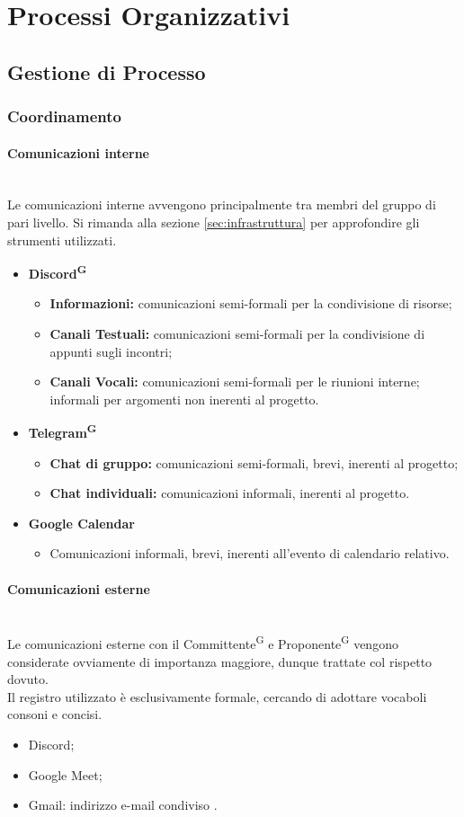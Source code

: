 \documentclass[8pt]{article}
\newcommand{\glossterm}[1]{#1\textsuperscript{G}} %
\newcommand{\subsubsubsection}[1]{\paragraph{#1}\mbox{}\\}
\begin{document}
\section{Processi Organizzativi} \label{sec:processi_organizzativi}

\subsection{Gestione di Processo}

\subsubsection{Coordinamento} \label{sec:coordinamento}

\subsubsubsection{Comunicazioni interne}
Le comunicazioni interne avvengono principalmente tra membri del gruppo di pari livello. Si rimanda alla sezione \hypersetup{hidelinks}\ref{sec:infrastruttura} per approfondire gli strumenti utilizzati.
\begin{itemize}
  \item{\textbf{\glossterm{Discord}}}
  \begin{itemize}
    \item \textbf{Informazioni:} comunicazioni semi-formali per la condivisione di risorse;
    \item \textbf{Canali Testuali:} comunicazioni semi-formali per la condivisione di appunti sugli
        incontri;
    \item \textbf{Canali Vocali:} comunicazioni semi-formali per le riunioni interne; informali per argomenti non inerenti al progetto.
  \end{itemize}
  \item{\textbf{\glossterm{Telegram}}}
  \begin{itemize}
    \item \textbf{Chat di gruppo:} comunicazioni semi-formali, brevi, inerenti al progetto;
    \item \textbf{Chat individuali:} comunicazioni informali, inerenti al progetto.
  \end{itemize}
  \item{\textbf{Google Calendar}}
  \begin{itemize}
    \item{Comunicazioni informali, brevi, inerenti all'evento di calendario relativo.}
  \end{itemize}
\end{itemize}

\subsubsubsection{Comunicazioni esterne}
Le comunicazioni esterne con il \glossterm{Committente} e \glossterm{Proponente} vengono considerate ovviamente di importanza maggiore, dunque trattate col rispetto dovuto.\\
Il registro utilizzato è esclusivamente formale, cercando di adottare vocaboli consoni e concisi.
\begin{itemize}
  \item Discord;
  \item Google Meet;
  \item Gmail: indirizzo e-mail condiviso
      \href{nan1fyteam.unipd@gmail.com}{\color{black}{nan1fyteam.unipd@gmail.com}}.
\end{itemize}
\end{document}
